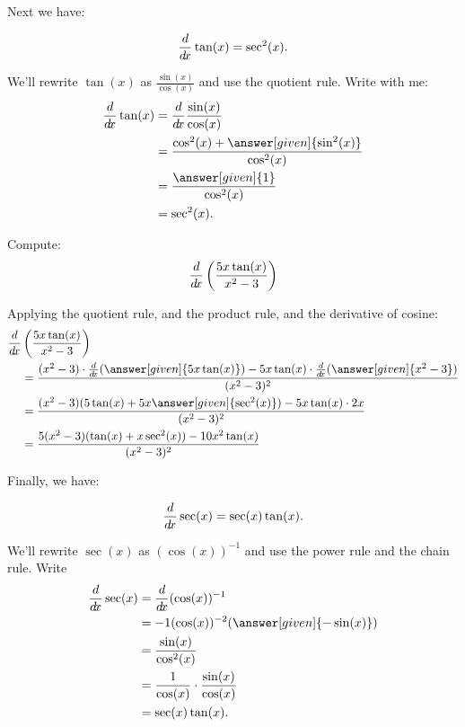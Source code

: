 \documentclass{ximera}
\begin{document}
Next we have:

\begin{theorem}
\[
\frac{d}{\mathop{}\!d\! x} \tan(x) = \sec^2(x).
\]

\begin{explanation}
We'll rewrite $\tan(x)$ as $\frac{\sin(x)}{\cos(x)}$ and use the
quotient rule. Write with me:
\begin{align*}
\ddx\tan(x) &= \ddx\frac{\sin(x)}{\cos(x)}\\
&=\frac{\cos^2(x) + \answer[given]{\sin^2(x)}}{\cos^2(x)}\\
&=\frac{\answer[given]{1}}{\cos^2(x)}\\
&=\sec^2(x).
\end{align*}
\end{explanation}
\end{theorem}

\begin{example}
Compute:
\[
\frac{d}{\mathop{}\!d\! x} \left( \frac{5x \tan(x)}{x^2 - 3} \right)
\]
\begin{explanation}
Applying the quotient rule, and the product rule, and the derivative
of cosine:
\begin{align*}
  \ddx &\left( \frac{5x \tan(x)}{x^2 - 3} \right) \\
  &= \frac{(x^2 - 3) \cdot \ddx(\answer[given]{5x \tan(x)}) - 5x \tan(x) \cdot \ddx (\answer[given]{x^2 - 3})}{(x^2 - 3)^2}  \\
  &= \frac{(x^2 - 3)(5 \tan(x) + 5x \answer[given]{\sec^2(x)}) - 5x \tan(x) \cdot 2x}{(x^2 - 3)^2}  \\
  &= \frac{5(x^2-3)(\tan(x)+x \sec^2(x)) - 10x^2 \tan(x)}{(x^2-3)^2}
\end{align*}
\end{explanation}
\end{example}

Finally, we have:

\begin{theorem}
\[
\frac{d}{\mathop{}\!d\! x} \sec(x) = \sec(x)\tan(x).
\]


\begin{explanation}
We'll rewrite $\sec(x)$ as $(\cos(x))^{-1}$ and use the power rule and the chain rule. Write
\begin{align*}
\ddx \sec(x) &= \ddx(\cos (x))^{-1}\\
&=-1(\cos(x))^{-2}(\answer[given]{-\sin(x)}) \\
&= \frac{\sin(x)}{\cos^2(x)} \\
&= \frac{1}{\cos(x)} \cdot \frac{\sin(x)}{\cos(x)}  \\
&= \sec(x)\tan(x).
\end{align*}
\end{explanation}
\end{theorem}
\end{document}

